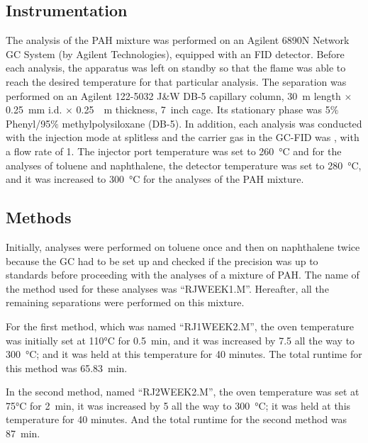 \documentclass[a4paper, 12pt]{article}
\begin{document}
\subsection{Instrumentation}
The analysis of the PAH mixture was performed on an Agilent 6890N Network GC System (by Agilent Technologies), equipped with an FID detector. Before each analysis, the apparatus was left on standby so that the flame was able to reach the desired temperature for that particular analysis. The separation was performed on an Agilent 122-5032 J\&W DB-5 capillary column, \SI{30}{m} length $\times$ \SI{0.25}{mm} i.d. $\times$ \SI{0.25}{\mu{}m} thickness, \SI{7}{inch} cage. Its stationary phase was 5$\%$ Phenyl/95$\%$ methylpolysiloxane (DB-5). In addition, each analysis was conducted with the injection mode at splitless and the carrier gas in the GC-FID was , with a flow rate of \SI{1}{}. The injector port temperature was set to \SI{260}{\degreeCelsius} and for the analyses of toluene and naphthalene, the detector temperature was set to \SI{280}{\degreeCelsius}, and it was increased to \SI{300}{\degreeCelsius} for the analyses of the PAH mixture.

\subsection{Methods}
Initially, analyses were performed on toluene once and then on naphthalene twice because the GC had to be set up and checked if the precision was up to standards before proceeding with the analyses of a mixture of PAH. The name of the method used for these analyses was ``RJWEEK1.M''. Hereafter, all the remaining separations were performed on this mixture.

For the first method, which was named ``RJ1WEEK2.M'', the oven temperature was initially set at \ang{110}\si{C} for \SI{0.5}{min}, and it was increased by \SI{7.5}{} all the way to \SI{300}{\degreeCelsius}; and it was held at this temperature for 40 minutes. The total runtime for this method was \SI{65.83}{\minute}. 

In the second method, named ``RJ2WEEK2.M'', the oven temperature was set at \ang{75}\si{C} for \SI{2}{min}, it was increased by \SI{5}{} all the way to \SI{300}{\degreeCelsius}; it was held at this temperature for 40 minutes. And the total runtime for the second method was \SI{87}{\minute}. 
\end{document}
